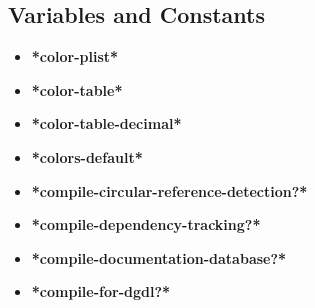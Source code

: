 \documentclass [11pt]{book}
\begin{document}
\subsection{Variables and Constants}

\label{subsec:variablesandconstants}



\begin{itemize}

\item {}
\label{prim:*color-plist*}
\textbf{*color-plist*}





\item {}
\label{prim:*color-table*}
\textbf{*color-table*}





\item {}
\label{prim:*color-table-decimal*}
\textbf{*color-table-decimal*}





\item {}
\label{prim:*colors-default*}
\textbf{*colors-default*}





\item {}
\label{prim:*compile-circular-reference-detection?*}
\textbf{*compile-circular-reference-detection?*}





\item {}
\label{prim:*compile-dependency-tracking?*}
\textbf{*compile-dependency-tracking?*}





\item {}
\label{prim:*compile-documentation-database?*}
\textbf{*compile-documentation-database?*}





\item {}
\label{prim:*compile-for-dgdl?*}
\textbf{*compile-for-dgdl?*}






\end{itemize}
\end{document}
